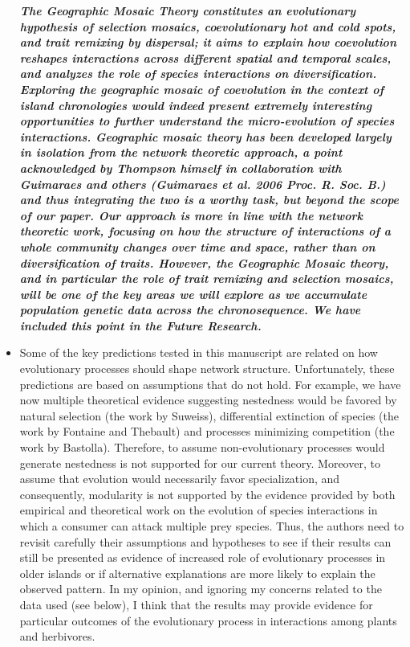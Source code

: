 \documentclass[12pt]{article}
\begin{document}
\begin{itemize}
  \textit{\textbf{The Geographic Mosaic Theory constitutes an
      evolutionary hypothesis of selection mosaics, coevolutionary hot
      and cold spots, and trait remixing by dispersal; it aims to
      explain how coevolution reshapes interactions across different
      spatial and temporal scales, and analyzes the role of species
      interactions on diversification. Exploring the geographic mosaic
      of coevolution in the context of island chronologies would
      indeed present extremely interesting opportunities to further
      understand the micro-evolution of species
      interactions. Geographic mosaic theory has been developed
      largely in isolation from the network theoretic approach, a
      point acknowledged by Thompson himself in collaboration with
      Guimaraes and others (Guimaraes et al. 2006 Proc. R. Soc. B.)
      and thus integrating the two is a worthy task, but beyond the
      scope of our paper. Our approach is more in line with the
      network theoretic work, focusing on how the structure of
      interactions of a whole community changes over time and space,
      rather than on diversification of traits. However, the
      Geographic Mosaic theory, and in particular the role of trait
      remixing and selection mosaics, will be one of the key areas we
      will explore as we accumulate population genetic data across the
      chronosequence. We have included this point in the Future
      Research.}}
%
\item Some of the key predictions tested in this manuscript are
  related on how evolutionary processes should shape network
  structure. Unfortunately, these predictions are based on assumptions
  that do not hold. For example, we have now multiple theoretical
  evidence suggesting nestedness would be favored by natural selection
  (the work by Suweiss), differential extinction of species (the work
  by Fontaine and Thebault) and processes minimizing competition (the
  work by Bastolla). Therefore, to assume non-evolutionary processes
  would generate nestedness is not supported for our current
  theory. Moreover, to assume that evolution would necessarily favor
  specialization, and consequently, modularity is not supported by the
  evidence provided by both empirical and theoretical work on the
  evolution of species interactions in which a consumer can attack
  multiple prey species. Thus, the authors need to revisit carefully
  their assumptions and hypotheses to see if their results can still
  be presented as evidence of increased role of evolutionary processes
  in older islands or if alternative explanations are more likely to
  explain the observed pattern. In my opinion, and ignoring my
  concerns related to the data used (see below), I think that the
  results may provide evidence for particular outcomes of the
  evolutionary process in interactions among plants and herbivores.


\end{itemize}
\end{document}
